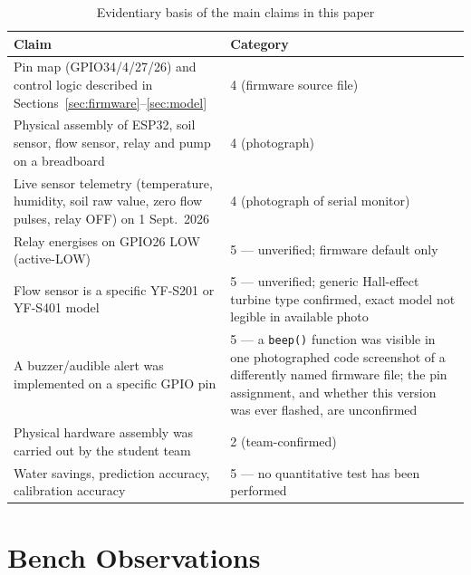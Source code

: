 \documentclass[conference]{IEEEtran}
\begin{document}
\begin{table}[t]
\caption{Evidentiary basis of the main claims in this paper}
\label{tab:evidence}
\centering
\begin{tabular}{@{}p{}p{}@{}}
\toprule
\textbf{Claim} & \textbf{Category} \\
\midrule
Pin map (GPIO34/4/27/26) and control logic described in Sections~\ref{sec:firmware}--\ref{sec:model} & 4 (firmware source file) \\
Physical assembly of ESP32, soil sensor, flow sensor, relay and pump on a breadboard & 4 (photograph) \\
Live sensor telemetry (temperature, humidity, soil raw value, zero flow pulses, relay OFF) on 1 Sept.\ 2026 & 4 (photograph of serial monitor) \\
Relay energises on GPIO26 LOW (active-LOW) & 5 --- unverified; firmware default only \\
Flow sensor is a specific YF-S201 or YF-S401 model & 5 --- unverified; generic Hall-effect turbine type confirmed, exact model not legible in available photo \\
A buzzer/audible alert was implemented on a specific GPIO pin & 5 --- a \texttt{beep()} function was visible in one photographed code screenshot of a differently named firmware file; the pin assignment, and whether this version was ever flashed, are unconfirmed \\
Physical hardware assembly was carried out by the student team & 2 (team-confirmed) \\
Water savings, prediction accuracy, calibration accuracy & 5 --- no quantitative test has been performed \\
\bottomrule
\end{tabular}
\end{table}

\section{Bench Observations}
\label{sec:observations}
\end{document}
